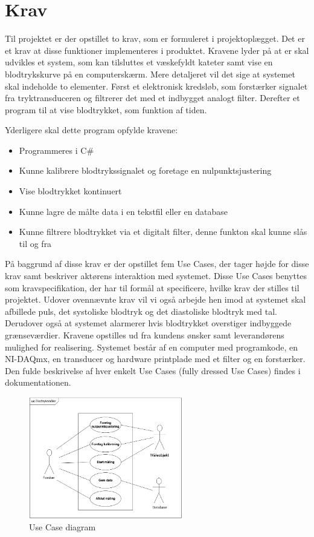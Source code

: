 \chapter{Krav}
Til projektet er der opstillet to krav, som er formuleret i projektoplægget. Det er et krav at disse funktioner implementeres i produktet. Kravene lyder på at er skal udvikles et system, som kan tilsluttes et væskefyldt kateter samt vise en blodtrykskurve på en computerskærm. Mere detaljeret vil det sige at systemet skal indeholde to elementer. Først et elektronisk kredsløb, som forstærker signalet fra tryktransduceren og filtrerer det med et indbygget analogt filter. Derefter et program til at vise blodtrykket, som funktion af tiden.

Yderligere skal dette program opfylde kravene:
\begin{itemize}
\item Programmeres i C\#
\item Kunne kalibrere blodtrykssignalet og foretage en nulpunktsjustering
\item Vise blodtrykket kontinuert
\item Kunne lagre de målte data i en tekstfil eller en database
\item Kunne filtrere blodtrykket via et digitalt filter, denne funkton skal kunne slås til og fra
\end{itemize}

På baggrund af disse krav er der opstillet fem Use Cases, der tager højde for disse krav samt beskriver aktørens interaktion med systemet. Disse Use Cases benyttes som kravspecifikation, der har til formål at specificere, hvilke krav der stilles til projektet. Udover ovennævnte krav vil vi også arbejde hen imod at systemet skal afbillede puls, det systoliske blodtryk og det diastoliske blodtryk med tal. Derudover også at systemet alarmerer hvis blodtrykket overstiger indbyggede grænseværdier.
Kravene opstilles ud fra kundens ønsker samt leverandørens mulighed for realisering. Systemet består af en computer med programkode, en NI-DAQmx, en transducer og hardware printplade med et filter og en forstærker. Den fulde beskrivelse af hver enkelt Use Cases (fully dressed Use Cases) findes i dokumentationen. 

\begin{figure}[htb]
	\centering
	\includegraphics[width=0.6\textwidth]{Figurer/UseCasediagram}
	\caption{Use Case diagram}
\end{figure}

